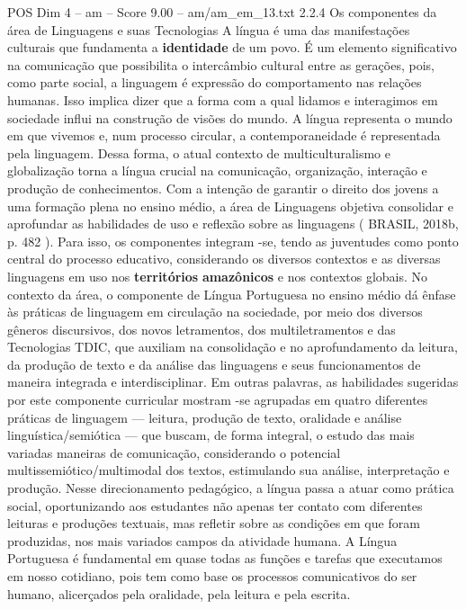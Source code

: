 \begin{textsample}{POS Dim 4 – am – Score 9.00 – am/am\_em\_13.txt}  \label{ex:f4_pos_107}
2.2.4 Os componentes da área de Linguagens e suas Tecnologias A língua é uma das manifestações culturais que fundamenta a \textbf{identidade} de um povo.
É um elemento significativo na comunicação que possibilita o intercâmbio cultural entre as gerações, pois, como parte social, a linguagem é expressão do comportamento nas relações humanas.
Isso implica dizer que a forma com a qual lidamos e interagimos em sociedade influi na construção de visões do mundo.
A língua representa o mundo em que vivemos e, num processo circular, a contemporaneidade é representada pela linguagem.
Dessa forma, o atual contexto de multiculturalismo e globalização torna a língua crucial na comunicação, organização, interação e produção de conhecimentos.
Com a intenção de garantir o direito dos jovens a uma formação plena no ensino médio, a área de Linguagens objetiva consolidar e aprofundar as habilidades de uso e reflexão sobre as linguagens ( BRASIL, 2018b, p. 482 ).
Para isso, os componentes integram -se, tendo as juventudes como ponto central do processo educativo, considerando os diversos contextos e as diversas linguagens em uso nos \textbf{territórios} \textbf{amazônicos} e nos contextos globais.
No contexto da área, o componente de Língua Portuguesa no ensino médio dá ênfase às práticas de linguagem em circulação na sociedade, por meio dos diversos gêneros discursivos, dos novos letramentos, dos multiletramentos e das Tecnologias TDIC, que auxiliam na consolidação e no aprofundamento da leitura, da produção de texto e da análise das linguagens e seus funcionamentos de maneira integrada e interdisciplinar.
Em outras palavras, as habilidades sugeridas por este componente curricular mostram -se agrupadas em quatro diferentes práticas de linguagem — leitura, produção de texto, oralidade e análise linguística/semiótica — que buscam, de forma integral, o estudo das mais variadas maneiras de comunicação, considerando o potencial multissemiótico/multimodal dos textos, estimulando sua análise, interpretação e produção.
Nesse direcionamento pedagógico, a língua passa a atuar como prática social, oportunizando aos estudantes não apenas ter contato com diferentes leituras e produções textuais, mas refletir sobre as condições em que foram produzidas, nos mais variados campos da atividade humana.
A Língua Portuguesa é fundamental em quase todas as funções e tarefas que executamos em nosso cotidiano, pois tem como base os processos comunicativos do ser humano, alicerçados pela oralidade, pela leitura e pela escrita.

\end{textsample}
